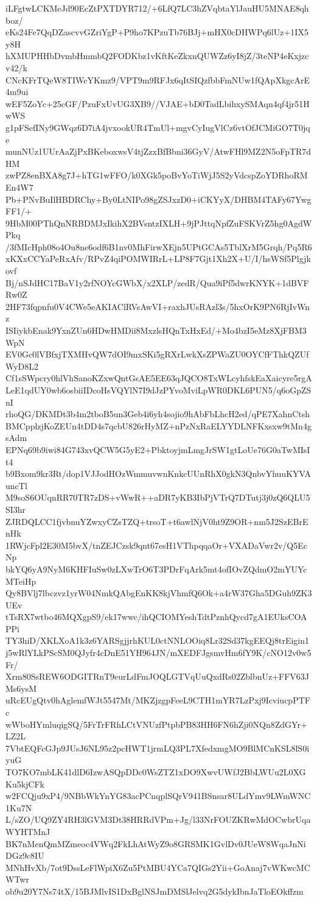 iLFgtwLCKMeJd90EcZtPXTDYR712/+6LfQ7LC3hZVqbtaYlJauHU5MNAE8qhboz/
eKs24Fe7QqDZascvvGZriYgP+P9ho7KPzuTb76BJj+mHX0cDHWPq6lUz+1IX5y8H
hXMUPHHbDvmbHmmbQ2FODKbz1vKftKeZkxnQUWZz6yI8jZ/3teNP4eKxjzcv42/k
CNcKFrTQeW8TIWcYKmz9/VPT9m9RFJx6qItSIQzfbbFmNUw1fQApXkgcArE4m9ui
wEF5ZoYc+25cGF/PzuFxUvUG3XB9//VJAE+bD0TadLbihxySMAqn4qf4jr51HwWS
g1pFSefINy9GWqz6D7iA4jvxookUR4TmUl+mgvCyIugVlCz6vtOfJCMiGO7T0jqe
munNUz1UUrAaZjPxBKeboxwsV4tjZzxBfBbni36GyV/AtwFHl9MZ2N5oFpTR7dHM
zwPZ8enBXA8g7J+hTG1wFFO/k0XGk5poBvYoTiWjJ5S2yVdcspZoYDRhoRMEn4W7
Pb+PNvBuIlHBDRChy+By0LtNIPo98gZSJxzD0+iCKYyX/DHBM4TAFy67YwgFF1/+
9HbM00PThQnNRBDMJxIkihX2BVsntzIXLH+9jPJttqNpfZuFSKVrZ5hg0AgdWPkq
/3fMIcHph08o4Ou8ne6odf6B1nv0MhFirwXEjn5UPtGCAs5TblXrM5Grqh/Pq5R6
xKXxCCYaPeRxAfv/RPvZ4qiPOMWIRrL+LP8F7Gjt1Xh2X+U/I/hsWSf5Plgjkovf
Bj/nSJdHC17BaV1y2rfNOYcGWbX/x2XLP/zedR/Qua9iPf5dwrKNYK+1dBVFRw0Z
2HF73fqpnfu0V4CWe5eAKIAClRVsAwVI+raxhJUsRAzl3s/5hxOrK9PN6RjIvWnz
ISIiykbEnak9YxnZUn6HDwHMDii8MxzlsHQnTxHxEd/+Mo4bzI5eMz8XjFBM3WpN
EV0Gc0lVBfxjTXMHvQW7dOI9mxSKi5gRXrLwkXsZPWaZU0OYCfFThkQZUfWyD8L2
Cf1sSWpcry0hlVhSanoKZxwQntGsAE5EE63qJQCO8TxWLcyhfskEaXaicyre5rgA
LeE1qdUY0wb6osbiiIDcoHsVQYlN7I9dJzPYvoMviLpWR0DKL6PUN5/q6oGpZSnI
rhoQG/DKMDt3b4m2tboB5un3Geb4i6yh4sojio9hAbFbLhcH2ed/qPE7XahnCtsh
BMCpplzjKoZEUn4tDD4s7qcbU826rHyMZ+nPzNxRaELYYDLNFKxsxw9tMn4gsAdm
EPNq69b9iwi84G743xvQCW5G5yE2+PbktoyjmLmgJrSW1gtLoUe76G0aTwMIsIt4
b9Bxom9kr3Rt/dop1VJJodHOzWmmuvwnKnkcUUnRhX0gkN3QnbvYhuuKYVAuncTl
M9soS6OUqnRR70TR7zDS+vWwR++aDR7yKB3IbPjVTrQ7DTutj3j0zQ6QLU5SI3hr
ZJRDQLCC1fjvbnuYZwxyCZsTZQ+trsoT+t6awlNjV0ht9Z9OR+nm5J2SzEBrEnHk
1RWjcFpl2E30M5bvX/tnZEJCzsk9qnt67esH1VThpqqaOr+VXADaVwr2v/Q5EcNp
bkYQ6yA9NyM6KHFIuSw0zLXwTrO6T3PDrFqArk5mt4ofIOvZQdmO2mYUYcMTeiHp
Qy8BVlj7lbczvz1yrW04NmkQAbgEnKK8kjVhmfQ6Ok+a4rW37Gha5DGuh9ZK3UEv
tTsRX7wtbo46MQXgpS9/ek17wwc/ihQCIOMYeshTdtPznhQycd7gA1EUksCOAPPi
TY3hiD/XKLXoA1k3z6YARSgjjrhKUL0ctNNLOOiq8Lr32Sd37kgEEQj8trEigin1
j5wRlYLkPScSM0QJyfr4cDnE51YH964JN/mXEDFJgsmvHm6fY9K/cNO12v0w5Fr/
Xrm80SsREW6ODGITRnT9eurLdFmJOQLGTVqUuQxdRs02ZblbnUz+FFV63JMs6ysM
uRcEUgQtv0hAglemfWJt5547Mt/MKZjzgpFeeL9CTH1mYR7LzPxj9IcviucpPTFc
wWboHYmluqigSQ/5FrTrFRhLCtVNUzfPtpbPB83HH6FN6hZji0NQn8ZdGYr+LZ2L
7VbtEQFcGJp9JUsJ6NL95z2pcHWT1jrmLQ3PL7XfedxmgMO9BlMCnKSL8lS0iyuG
TO7KO7mbLK41dlD6IzwASQpDDc0WsZTZ1xDO9XwvUWfJ2BbLWUu2L0XGKu5kjCFk
w2FCQju9xP4/9NBbWkYnYG83acPCnqplSQrV941BSnsar8ULdYmv9LWmWNC1Ku7N
L/sZO/UQ9ZY4RH3lGVM3Dt38HRRdVPm+Jg/l33NrFOUZKRwMdOCwbrUqaWYHTMnJ
BK7nMenQmMZmeoc4VWq2FkLhAtWyZ9o8GRSMK1GvlDv0JUeW8WqaJnNiDGz9c8IU
MNhHvXb/7ot9DssLeFlWpiX6Zu5PtMBU4YCa7QIGs2Yii+GoAnaj7vWKwcMCWTwr
ob9u20Y7Ns74tX/15BJMlvIS1DxBglNSJmDMSlJelvq2G5dykIbnJaTloEOkffzm
